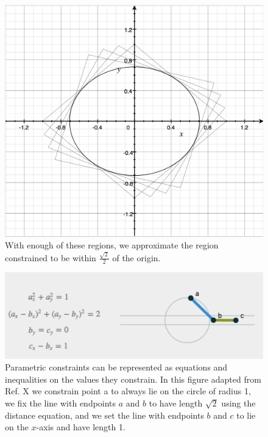 \begin{figure}[H] 
\includegraphics[scale=0.4]{dist3.png}
\caption{With enough of these regions, we approximate the region constrained to be within $\frac{\sqrt{2}}{2}$ of the origin.}
\label{dist3}
\end{figure}


\begin{figure}[H]
  \includegraphics[width=\linewidth]{constraints.jpg}
  \caption{Parametric constraints can be represented as equations and inequalities on the values they constrain. In this figure adapted from Ref. X we constrain point a to always lie on the circle of radius 1, we fix the line with endpoints $a$ and $b$ to have length $\sqrt{2}$ using the distance equation, and we set the line with endpoints $b$ and $c$ to lie on the $x$-axis and have length 1.}
  \label{fig:constraints}
\end{figure}


